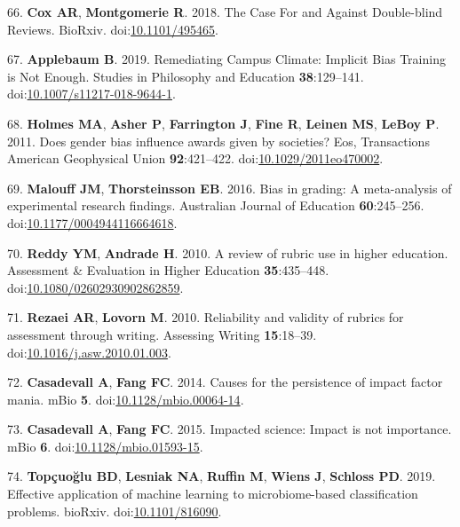 \documentclass[11pt,]{article}
\begin{document}
\hypertarget{ref-cox_case_2018}{}
66. \textbf{Cox AR}, \textbf{Montgomerie R}. 2018. The Case For and
Against Double-blind Reviews. BioRxiv.
doi:\href{https://doi.org/10.1101/495465}{10.1101/495465}.

\hypertarget{ref-applebaum_remediating_2019}{}
67. \textbf{Applebaum B}. 2019. Remediating Campus Climate: Implicit
Bias Training is Not Enough. Studies in Philosophy and Education
\textbf{38}:129--141.
doi:\href{https://doi.org/10.1007/s11217-018-9644-1}{10.1007/s11217-018-9644-1}.

\hypertarget{ref-Holmes2011}{}
68. \textbf{Holmes MA}, \textbf{Asher P}, \textbf{Farrington J},
\textbf{Fine R}, \textbf{Leinen MS}, \textbf{LeBoy P}. 2011. Does gender
bias influence awards given by societies? Eos, Transactions American
Geophysical Union \textbf{92}:421--422.
doi:\href{https://doi.org/10.1029/2011eo470002}{10.1029/2011eo470002}.

\hypertarget{ref-Malouff2016}{}
69. \textbf{Malouff JM}, \textbf{Thorsteinsson EB}. 2016. Bias in
grading: A meta-analysis of experimental research findings. Australian
Journal of Education \textbf{60}:245--256.
doi:\href{https://doi.org/10.1177/0004944116664618}{10.1177/0004944116664618}.

\hypertarget{ref-Reddy2010}{}
70. \textbf{Reddy YM}, \textbf{Andrade H}. 2010. A review of rubric use
in higher education. Assessment \& Evaluation in Higher Education
\textbf{35}:435--448.
doi:\href{https://doi.org/10.1080/02602930902862859}{10.1080/02602930902862859}.

\hypertarget{ref-Rezaei2010}{}
71. \textbf{Rezaei AR}, \textbf{Lovorn M}. 2010. Reliability and
validity of rubrics for assessment through writing. Assessing Writing
\textbf{15}:18--39.
doi:\href{https://doi.org/10.1016/j.asw.2010.01.003}{10.1016/j.asw.2010.01.003}.

\hypertarget{ref-Casadevall2014}{}
72. \textbf{Casadevall A}, \textbf{Fang FC}. 2014. Causes for the
persistence of impact factor mania. mBio \textbf{5}.
doi:\href{https://doi.org/10.1128/mbio.00064-14}{10.1128/mbio.00064-14}.

\hypertarget{ref-Casadevall2015}{}
73. \textbf{Casadevall A}, \textbf{Fang FC}. 2015. Impacted science:
Impact is not importance. mBio \textbf{6}.
doi:\href{https://doi.org/10.1128/mbio.01593-15}{10.1128/mbio.01593-15}.

\hypertarget{ref-Topcuoglu2019}{}
74. \textbf{Topçuoğlu BD}, \textbf{Lesniak NA}, \textbf{Ruffin M},
\textbf{Wiens J}, \textbf{Schloss PD}. 2019. Effective application of
machine learning to microbiome-based classification problems. bioRxiv.
doi:\href{https://doi.org/10.1101/816090}{10.1101/816090}.
\end{document}
